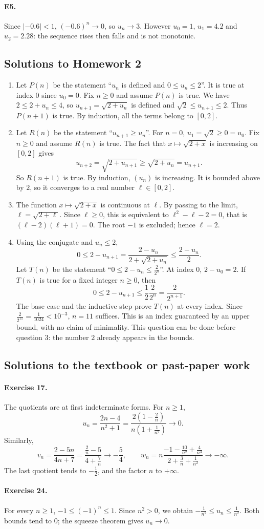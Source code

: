 \paragraph{E5.}Since $|-\num{0,6}|<1$, $(-\num{0,6})^n\to0$, so $u_n\to3$. However $u_0=1$, $u_1=\num{4,2}$ and $u_2=\num{2,28}$: the sequence rises then falls and is not monotonic.

\subsection{Solutions to Homework 2}\begin{enumerate}
\item Let $P(n)$ be the statement ``$u_n$ is defined and $0\le u_n\le2$''. It is true at index $0$ since $u_0=0$. Fix $n\ge0$ and assume $P(n)$ is true. We have $2\le2+u_n\le4$, so $u_{n+1}=\sqrt{2+u_n}$ is defined and $\sqrt2\le u_{n+1}\le2$. Thus $P(n+1)$ is true. By induction, all the terms belong to $[0,2]$.
\item Let $R(n)$ be the statement ``$u_{n+1}\ge u_n$''. For $n=0$, $u_1=\sqrt2\ge0=u_0$. Fix $n\ge0$ and assume $R(n)$ is true. The fact that $x\mapsto\sqrt{2+x}$ is increasing on $[0,2]$ gives
\[u_{n+2}=\sqrt{2+u_{n+1}}\ge\sqrt{2+u_n}=u_{n+1}.\]
So $R(n+1)$ is true. By induction, $(u_n)$ is increasing. It is bounded above by $2$, so it converges to a real number $\ell\in[0,2]$.
\item The function $x\mapsto\sqrt{2+x}$ is continuous at $\ell$. By passing to the limit, $\ell=\sqrt{2+\ell}$. Since $\ell\ge0$, this is equivalent to $\ell^2-\ell-2=0$, that is $(\ell-2)(\ell+1)=0$. The root $-1$ is excluded; hence $\ell=2$.
\item Using the conjugate and $u_n\le2$,
\[0\le2-u_{n+1}=\frac{2-u_n}{2+\sqrt{2+u_n}}\le\frac{2-u_n}{2}.\]
Let $T(n)$ be the statement ``$0\le2-u_n\le\frac{2}{2^n}$''. At index $0$, $2-u_0=2$. If $T(n)$ is true for a fixed integer $n\ge0$, then
\[0\le2-u_{n+1}\le\frac12\frac2{2^n}=\frac2{2^{n+1}}.\]
The base case and the inductive step prove $T(n)$ at every index. Since $\frac{2}{2^{11}}=\frac{1}{1024}<10^{-3}$, $n=11$ suffices. This is an index guaranteed by an upper bound, with no claim of minimality. This question can be done before question 3: the number $2$ already appears in the bounds.
\end{enumerate}

\subsection{Solutions to the textbook or past-paper work}\paragraph{Exercise 17.} The quotients are at first indeterminate forms. For $n\ge1$,
\[u_n=\frac{2n-4}{n^2+1}=\frac{2\left(1-\frac2n\right)}{n\left(1+\frac1{n^2}\right)}\longrightarrow0.\]
Similarly,
\[v_n=\frac{2-5n}{4n+7}=\frac{\frac2n-5}{4+\frac7n}\longrightarrow-\frac54,\qquad w_n=n\frac{-1-\frac{10}{n^2}+\frac4{n^3}}{2+\frac3n+\frac1{n^2}}\longrightarrow-\infty.\]
The last quotient tends to $-\frac12$, and the factor $n$ to $+\infty$.
\paragraph{Exercise 24.} For every $n\ge1$, $-1\le(-1)^n\le1$. Since $n^2>0$, we obtain $-\frac1{n^2}\le u_n\le\frac1{n^2}$. Both bounds tend to $0$; the squeeze theorem gives $u_n\to0$.

\fi

